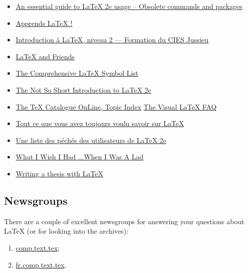 \documentclass{boostreport}
\begin{document}
\begin{itemize}
    \item \href{http://www.ctan.org/tex-archive/info/l2tabu/}{An essential
    guide to LaTeX 2e usage -- Obsolete commands and packages}
    \item \href{http://tex.loria.fr/general/apprends-latex.pdf}{Apprends
    LaTeX !}
    \item \href{http://people.math.jussieu.fr/~mpg/latex/2007-niv2/pres-lvl2.pdf}
    {Introduction à LaTeX, niveau 2 --- Formation du CIES Jussieu}
    \item \href{http://csweb.ucc.ie/~dongen/LaTeX-and-Friends.pdf}{LaTeX and
    Friends}
    \item \href{%
    http://www.ctan.org/tex-archive/info/symbols/comprehensive/symbols-a4.pdf}
    {The Comprehensive LaTeX Symbol List}
    \item \href{http://tobi.oetiker.ch/lshort/lshort.pdf}{The Not So Short
    Introduction to LaTeX 2e}
    \item \href{http://mirror.ctan.org/help/Catalogue/bytopic.html}{The TeX
    Catalogue OnLine, Topic Index}
    \href{http://ctan.tug.org/tex-archive/info/visualFAQ/visualFAQ.pdf}{The
    Visual LaTeX FAQ}
    \item \href{http://cours.enise.fr/info/latex/}{Tout ce que vous avez
    toujours voulu savoir sur LaTeX}
    \item
    \href{http://www.lsv.ens-cachan.fr/~markey/LaTeX/doc/l2tabufr.pdf}{Une
    liste des péchés des utilisateurs de LaTeX 2e}
    \item
    \href{http://www.tug.org/pracjourn/2006-4/hefferon/hefferon.pdf}{What I
    Wish I Had ...When I Was A Lad}
    \item \href{http://www.tug.org/pracjourn/2008-1/mori/mori.pdf}{Writing a
    thesis with LaTeX}
\end{itemize}

\subsection{Newsgroups}
\label{sec:newsgroups}

There are a couple of excellent newsgroups for answering your questions
about \LaTeX{} (or for looking into the archives):

\begin{enumerate}
    \item \url{comp.text.tex};
    \item \url{fr.comp.text.tex}.
\end{enumerate}
\end{document}
